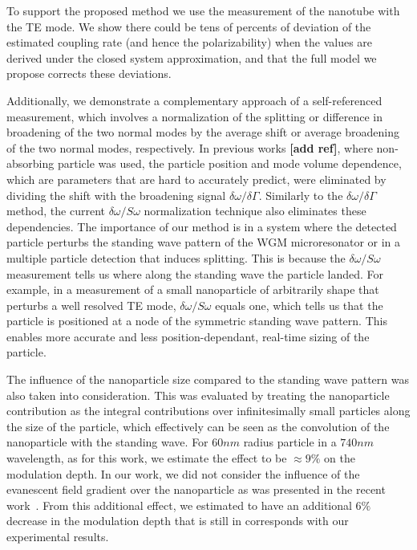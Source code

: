 \documentclass[journal=jacsat,manuscript=article]{achemso}
\begin{document}
To support the proposed method we use the measurement of the nanotube with the TE mode. We show there could be tens of percents of deviation of the estimated coupling rate (and hence the polarizability) when the values are derived under the closed system approximation, and that the full model we propose corrects these deviations.

Additionally, we demonstrate a complementary approach of a self-referenced measurement, which involves a normalization of the splitting or difference in broadening of the two normal modes by the average shift or average broadening of the two normal modes, respectively. In previous works \textbf{[add ref]}, where non-absorbing particle was used, the particle position and mode volume dependence, which are parameters that are hard to accurately predict, were eliminated by dividing the shift with the broadening signal $\delta \omega / \delta \Gamma$. Similarly to the $\delta \omega / \delta \Gamma$ method, the current $\delta \omega / \textit{S} \omega$ normalization technique also eliminates these dependencies. The importance of our method is in a system where the detected particle perturbs the standing wave pattern of the WGM microresonator or in a multiple particle detection that induces splitting. This is because the $\delta \omega / \textit{S} \omega$ measurement tells us where along the standing wave the particle landed. For example, in a measurement of a small nanoparticle of arbitrarily shape that perturbs a well resolved TE mode, $\delta \omega / \textit{S} \omega$ equals one, which tells us that the particle is positioned at a node of the symmetric standing wave pattern. This enables more accurate and less position-dependant, real-time sizing of the particle.

The influence of the nanoparticle size compared to the standing wave pattern was also taken into consideration. This was evaluated by treating the nanoparticle contribution as the integral contributions over infinitesimally small particles along the size of the particle, which effectively can be seen as the convolution of the nanoparticle with the standing wave. For $60nm$ radius particle in a $740 nm$ wavelength, as for this work, we estimate the effect to be $\approx 9\% $ on the modulation depth.
In our work, we did not consider the influence of the evanescent field gradient over the nanoparticle as was presented in the recent work~\cite{foreman2017Whispering}. From this additional effect, we estimated to have an additional $6 \% $ decrease in the modulation depth that is still in corresponds with our experimental results.
\end{document}
